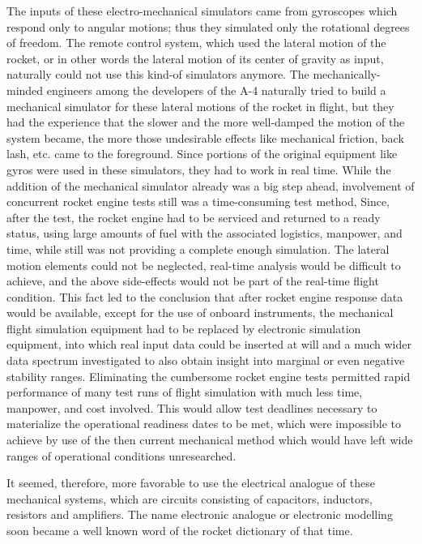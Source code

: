 \documentclass[11pt, a4paper]{article}
\begin{document}
The inputs of these electro-mechanical simulators came from gyroscopes which respond only to angular motions; thus they simulated only the rotational degrees of freedom. The remote control system, which used the lateral motion of the rocket, or in other words the lateral motion of its center of gravity as input, naturally could not use this kind-of simulators anymore. The mechanically-minded engineers among the developers of the A-4 naturally tried to build a mechanical simulator for these lateral motions of the rocket in flight, but they had the experience that the slower and the more well-damped the motion of the system became, the more those undesirable effects like mechanical friction, back lash, etc. came to the foreground. Since portions of the original equipment like gyros were used in these simulators, they had to work in real time. While the addition of the mechanical simulator already was a big step ahead, involvement of concurrent rocket engine tests still was a time-consuming test method, Since, after the test, the rocket engine had to be serviced and returned to a ready status, using large amounts of fuel with the associated logistics, manpower, and time, while still was not providing a complete enough simulation. The lateral motion elements could not be neglected, real-time analysis would be difficult to achieve, and the above side-effects would not be part of the real-time flight condition. This fact led to the conclusion that after rocket engine response data would be available, except for the use of onboard instruments, the mechanical flight simulation equipment had to be replaced by electronic simulation equipment, into which real input data could be inserted at will and a much wider data spectrum investigated to also obtain insight into marginal or even negative stability ranges. Eliminating the cumbersome rocket engine tests permitted rapid performance of many test runs of flight simulation with much less time, manpower, and cost involved. This would allow test deadlines necessary to materialize the operational readiness dates to be met, which were impossible to achieve by use of the then current mechanical method which would have left wide ranges of operational conditions unresearched.

It seemed, therefore, more favorable to use the electrical analogue of these mechanical systems, which are circuits consisting of capacitors, inductors, resistors and amplifiers. The name electronic analogue or electronic modelling soon became a well known word of the rocket dictionary of that time.
\end{document}
